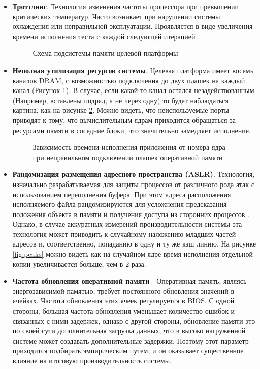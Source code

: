 \begin{itemize}
	\item  \textbf{Троттлинг}. Технология изменения частоты процессора при превышении критических температур. Часто возникает при нарушении системы охлаждения или неправильной эксплуатации. Проявляется в виде увеличения времени исполнения теста с каждой следующей итерацией \cite{zhang2009hardware}.
		\begin{figure}[ht]
		\caption{Схема подсистемы памяти целевой платформы}\label{fig:ddrsvg1}
	\end{figure}
	\item  \textbf{Неполная утилизация ресурсов системы}. Целевая платформа имеет восемь каналов DRAM, с возможностью подключения до двух плашек на каждый канал (Рисунок \ref{fig:ddrsvg1}). В случае, если какой-то канал остался незадействованным (Например, вставлены подряд, а не через одну) то будет наблюдаться картина, как на рисунке \ref{fig:lack_of_memmory}. Можно видеть, что неиспользуемые порты приводят к тому, что вычислительным ядрам приходится обращаться за ресурсами памяти в соседние блоки, что значительно замедляет исполнение.

	
	\begin{figure}[ht]
		\caption{Зависимость времени исполнения приложения от номера ядра при неправильном подключении плашек оперативной памяти}\label{fig:lack_of_memmory}
	\end{figure}
	\item \textbf{Рандомизация размещения адресного пространства (ASLR)}. Технология, изначально разрабатываемая для защиты процессов от различного рода атак с использованием  переполнения буфера. При этом  адреса расположения исполняемого файла рандомизируются для усложнения предсказания положения объекта в памяти и получения доступа из сторонних процессов \cite{gras2017aslr}. Однако, в случае аккуратных измерений производительности системы эта технология может приводить к случайному наложению младших частей адресов и, соответственно, попаданию в одну и ту же кэш линию. На рисунке \ref{fig:peaks}  можно видеть как на случайном ядре время исполнения отдельной копии увеличивается больше, чем в 2 раза.
	\item \textbf{Частота обновления оперативной памяти} - Оперативная память, являясь энергозависимой памятью, требует постоянного обновления значений в ячейках. Частота обновления этих ячеек регулируется в BIOS. С одной стороны, большая частота обновления уменьшает количество ошибок и связанных с ними задержек, однако с другой стороны, обновление памяти это по своей сути дополнительная загрузка данных, что в высоко нагруженной системе может создавать дополнительные задержки. Поэтому этот параметр приходится подбирать эмпирическим путем, и он оказывает существенное влияние на итоговую производительность системы.
	

\end{itemize}
